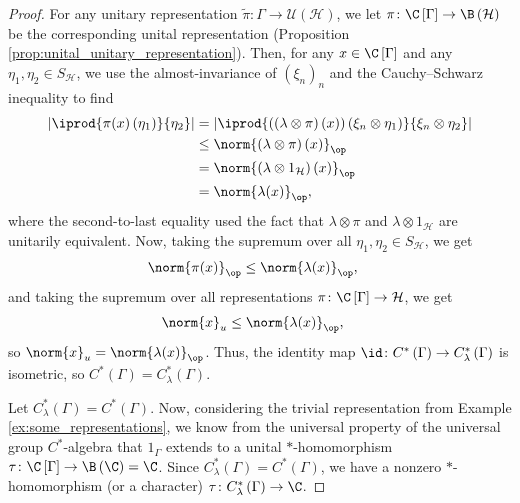 \begin{proof}
  For any unitary representation $\widetilde{\pi}\colon \Gamma\rightarrow \mathcal{U}\left( \mathcal{H} \right)$, we let $\pi\colon \C\left[ \Gamma \right]\rightarrow \B\left( \mathcal{H} \right)$ be the corresponding unital representation (Proposition \ref{prop:unital_unitary_representation}). Then, for any $x\in \C\left[ \Gamma \right]$ and any $\eta_1,\eta_2\in S_{\mathcal{H}}$, we use the almost-invariance of $\left( \xi_n \right)_n$ and the Cauchy--Schwarz inequality to find
  \begin{align*}
    \left\vert \iprod{\pi(x)\left( \eta_1 \right)}{\eta_2} \right\vert &= \left\vert \iprod{\left( \left( \lambda\otimes \pi \right)\left( x \right) \right)\left( \xi_n\otimes \eta_1 \right)}{\xi_n\otimes \eta_2} \right\vert\\
                                                                       &\leq \norm{\left( \lambda\otimes \pi \right)(x)}_{\op}\\
                                                                       &= \norm{\left( \lambda\otimes 1_{\mathcal{H}} \right)\left( x \right)}_{\op}\\
                                                                       &= \norm{\lambda(x)}_{\op},
  \end{align*}
  where the second-to-last equality used the fact that $\lambda\otimes \pi$ and $\lambda\otimes 1_{\mathcal{H}}$ are unitarily equivalent. Now, taking the supremum over all $\eta_1,\eta_2\in S_{\mathcal{H}}$, we get
  \begin{align*}
    \norm{\pi(x)}_{\op} &\leq \norm{\lambda(x)}_{\op},
  \end{align*}
  and taking the supremum over all representations $\pi\colon \C\left[ \Gamma \right]\rightarrow \mathcal{H}$, we get
  \begin{align*}
    \norm{x}_{u} &\leq \norm{\lambda(x)}_{\op},
  \end{align*}
  so $\norm{x}_u = \norm{\lambda(x)}_{\op}$. Thus, the identity map $\id\colon C^{\ast}\left( \Gamma \right)\rightarrow C^{\ast}_{\lambda}\left( \Gamma \right)$ is isometric, so $C^{\ast}\left( \Gamma \right) = C^{\ast}_{\lambda}\left( \Gamma \right)$.\newline

  Let $C^{\ast}_{\lambda}\left( \Gamma \right) = C^{\ast}\left( \Gamma \right)$. Now, considering the trivial representation from Example \ref{ex:some_representations}, we know from the universal property of the universal group $C^{\ast}$-algebra that $1_{\Gamma}$ extends to a unital $\ast$-homomorphism $\tau\colon \C\left[ \Gamma \right]\rightarrow \B\left( \C \right) = \C$. Since $C^{\ast}_{\lambda}\left( \Gamma \right) = C^{\ast}\left( \Gamma \right)$, we have a nonzero $\ast$-homomorphism (or a character) $\tau\colon C^{\ast}_{\lambda}\left( \Gamma \right)\rightarrow \C$.\newline


\end{proof}
